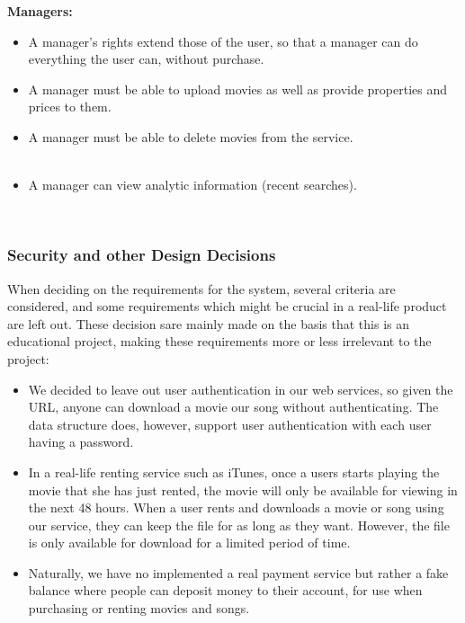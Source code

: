 \textbf{Managers:}
\begin{itemize}
\item A manager's rights extend those of the user, so that a manager can do everything the user can, without purchase. \\
\item A manager must be able to upload movies as well as provide properties and prices to them. \\
\item A manager must be able to delete movies from the service. \\\
\item A manager can view analytic information (recent searches). \\
\end{itemize} \\

\subsubsection{Security and other Design Decisions}
When deciding on the requirements for the system, several criteria are considered, and some requirements which might be crucial in a real-life product are left out. These decision sare mainly made on the basis that this is an educational project, making these requirements more or less irrelevant to the project: \\
\begin{itemize}
\item We decided to leave out user authentication in our web services, so given the URL, anyone can download a movie our song without authenticating. The data structure does, however, support user authentication with each user having a password. \\
\item In a real-life renting service such as iTunes, once a users starts playing the movie that she has just rented, the movie will only be available for viewing in the next 48 hours. When a user rents and downloads a movie or song using our service, they can keep the file for as long as they want. However, the file is only available for download for a limited period of time. \\
\item Naturally, we have no implemented a real payment service but rather a fake balance where people can deposit money to their account, for use when purchasing or renting movies and songs.
\end{itemize}